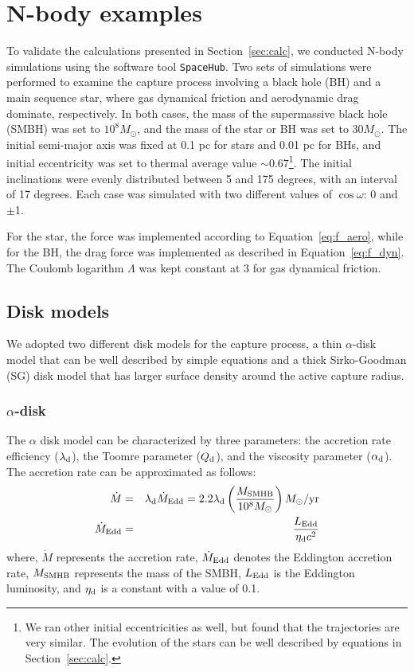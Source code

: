 \documentclass[fleqn,usenatbib]{mnras}
\begin{document}
\section{N-body examples}
To validate the calculations presented in Section~\ref{sec:calc}, we conducted N-body simulations using the software tool {\tt SpaceHub}\citep{Wang2021code}. Two sets of simulations were performed to examine the capture process involving a black hole (BH) and a main sequence star, where gas dynamical friction and aerodynamic drag dominate, respectively. In both cases, the mass of the supermassive black hole (SMBH) was set to $10^8M_\odot$, and the mass of the star or BH was set to $30M_\odot$. The initial semi-major axis was fixed at 0.1 pc for stars and 0.01 pc for BHs, and initial eccentricity was set to thermal average value $\sim 0.67$\footnote{We ran other initial eccentricities as well, but found that the trajectories are very similar. The evolution of the stars can be well described by equations in Section~\ref{sec:calc}.}. The initial inclinations were evenly distributed between 5 and 175 degrees, with an interval of 17 degrees. Each case was simulated with two different values of $\cos\omega$: 0 and {$\pm$}1.

For the star, the force was implemented according to Equation~\ref{eq:f_aero}, while for the BH, the drag force was implemented as described in Equation~\ref{eq:f_dyn}. The Coulomb logarithm $\Lambda$ was kept constant at 3 for gas dynamical friction.

\subsection{Disk models}\label{sec:disk}
We adopted two different disk models for the capture process, a thin $\alpha$-disk model that can be well described by simple equations and a thick Sirko-Goodman (SG) disk model that has larger surface density around the active capture radius.
\subsubsection{$\alpha$-disk}


The $\alpha$ disk model can be characterized by three parameters: the accretion rate efficiency ($\lambda_{\rm d}$), the Toomre parameter ($Q_{\rm d}$), and the viscosity parameter ($\alpha_{\rm d}$). The accretion rate can be approximated as follows:
\begin{eqnarray}
\dot{M}&=&\lambda_{\rm d} \dot{M}_{\rm Edd} = 2.2\lambda_{\rm d}\left(\frac{M_{\rm SMHB}}{10^8M_\odot}\right) M_\odot/{\rm yr}\\
\dot{M}_{\rm Edd} &=& \frac{L_{\rm Edd}}{\eta_{\rm d} c^2}
\end{eqnarray}
where, $\dot{M}$ represents the accretion rate, $\dot{M}_{\rm Edd}$ denotes the Eddington accretion rate, $M_{\rm SMHB}$ represents the mass of the SMBH, $L_{\rm Edd}$ is the Eddington luminosity, and $\eta_{\rm d}$ is a constant with a value of 0.1.
\end{document}
